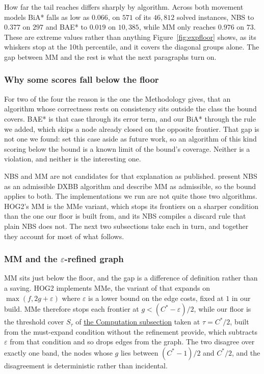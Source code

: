 \documentclass[letterpaper]{article} %
\begin{document}
How far the tail reaches differs sharply by algorithm. Across both movement models BiA* falls as low as $0.066$, on $571$ of its $46{,}812$ solved instances, NBS to $0.377$ on $297$ and BAE* to $0.019$ on $10{,}385$, while MM only reaches $0.976$ on $73$. These are extreme values rather than anything Figure~\ref{fig:expfloor} shows, as its whiskers stop at the 10th percentile, and it covers the diagonal groups alone. The gap between MM and the rest is what the next paragraphs turn on.

\subsubsection{Why some scores fall below the floor}
For two of the four the reason is the one the Methodology gives, that an algorithm whose correctness rests on consistency sits outside the class the bound covers. BAE* is that case through its error term, and our BiA* through the rule we added, which skips a node already closed on the opposite frontier. That gap is not one we found: \citet{eckerle2017sufficient} set this case aside as future work, so an algorithm of this kind scoring below the bound is a known limit of the bound's coverage. Neither is a violation, and neither is the interesting one.

NBS and MM are not candidates for that explanation as published. \citet{eckerle2017sufficient} present NBS as an admissible DXBB algorithm and describe MM as admissible, so the bound applies to both. The implementations we run are not quite those two algorithms. HOG2's MM is the MMe variant, which stops its frontiers on a sharper condition than the one our floor is built from, and its NBS compiles a discard rule that plain NBS does not. The next two subsections take each in turn, and together they account for most of what follows.

\subsubsection{MM and the $\varepsilon$-refined graph}
MM sits just below the floor, and the gap is a difference of definition rather than a saving. HOG2 implements MMe, the variant of \citet{holte2017mm} that expands on $\max(f, 2g+\varepsilon)$ where $\varepsilon$ is a lower bound on the edge costs, fixed at $1$ in our build. MMe therefore stops each frontier at $g < (C^*-\varepsilon)/2$, while our floor is the threshold cover $S_\tau$ of \hyperref[sec:computation]{the Computation subsection} taken at $\tau=C^*/2$, built from the must-expand condition without the refinement \citet{shaham2018consistent} provide, which subtracts $\varepsilon$ from that condition and so drops edges from the graph. The two disagree over exactly one band, the nodes whose $g$ lies between $(C^*-1)/2$ and $C^*/2$, and the disagreement is deterministic rather than incidental.
\end{document}
